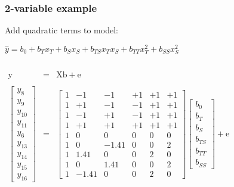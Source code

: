 \begin{frame}\frametitle{2-variable example}

	Add quadratic terms to model:

	$\hat{y} = b_0 + b_Tx_T + b_S x_S + b_{TS} x_T x_S + b_{TT} x_T^2 + b_{SS} x_S^2$

	$
	\begin{array}{rcl}
		\\
		\\
		\mathrm{y} &=& \mathrm{X} \mathrm{b} + \mathrm{e}\\
		\\
		\begin{bmatrix}
			y_8\\
			y_9\\
			y_{10} \\
			y_{11} \\
			y_{6} \\
			y_{13} \\
			y_{14} \\
			y_{15} \\
			y_{16}
		\end{bmatrix}
		&=&
		\begin{bmatrix}
			1 & -1 & -1 & +1 & +1 & +1\\
			1 & +1 & -1 & -1 & +1 & +1\\
			1 & -1 & +1 & -1 & +1 & +1\\
			1 & +1 & +1 & +1 & +1 & +1\\
			1 & 0 & 0 & 0 & 0 & 0\\
			1 & 0 &-1.41& 0 & 0 & 2\\
			1 & 1.41& 0& 0 & 2 & 0\\
			1 & 0 & 1.41& 0 & 0 & 2\\
			1 &-1.41& 0& 0 & 2 & 0
		\end{bmatrix}
		\begin{bmatrix}
			b_0 \\
			b_T \\
			b_S \\
			b_{TS} \\
			b_{TT} \\
			b_{SS}
		\end{bmatrix}
		+ \mathrm{e}
	\end{array}
	$
\end{frame}

